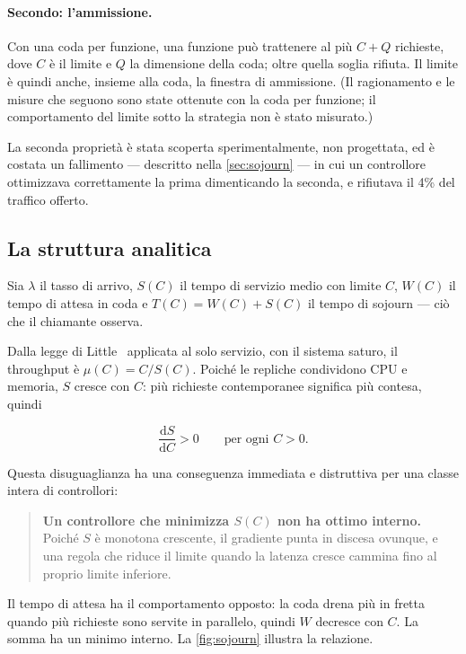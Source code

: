 \paragraph{Secondo: l'ammissione.} Con una coda per funzione, una funzione pu\`o
trattenere al pi\`u $C + Q$ richieste, dove $C$ \`e il limite e $Q$ la dimensione
della coda; oltre quella soglia rifiuta. Il limite \`e quindi anche, insieme alla
coda, la finestra di ammissione. (Il ragionamento e le misure che seguono
sono state ottenute con la coda per funzione; il comportamento del limite sotto la
strategia  non \`e stato misurato.)
\begin{damisurare}
\end{damisurare}

La seconda propriet\`a \`e stata scoperta sperimentalmente, non progettata, ed \`e
costata un fallimento --- descritto nella \cref{sec:sojourn} --- in cui un
controllore ottimizzava correttamente la prima dimenticando la seconda, e
rifiutava il 4\% del traffico offerto.

\subsection{La struttura analitica}

Sia $\lambda$ il tasso di arrivo, $S(C)$ il tempo di servizio medio con limite
$C$, $W(C)$ il tempo di attesa in coda e $T(C) = W(C) + S(C)$ il tempo di
sojourn --- ci\`o che il chiamante osserva.

Dalla legge di Little~\cite{little1961proof} applicata al solo servizio, con il
sistema saturo, il throughput \`e $\mu(C) = C / S(C)$. Poich\'e le repliche
condividono CPU e memoria, $S$ cresce con $C$: pi\`u richieste contemporanee
significa pi\`u contesa, quindi

\[
  \frac{\mathrm{d}S}{\mathrm{d}C} > 0 \qquad \text{per ogni } C > 0 .
\]

Questa disuguaglianza ha una conseguenza immediata e distruttiva per una classe
intera di controllori:

\begin{quote}
\textbf{Un controllore che minimizza $S(C)$ non ha ottimo interno.} Poich\'e $S$
\`e monotona crescente, il gradiente punta in discesa ovunque, e una regola che
riduce il limite quando la latenza cresce cammina fino al proprio limite
inferiore.
\end{quote}

Il tempo di attesa ha il comportamento opposto: la coda drena pi\`u in fretta
quando pi\`u richieste sono servite in parallelo, quindi $W$ decresce con $C$. La
somma ha un minimo interno. La \cref{fig:sojourn} illustra la relazione.

